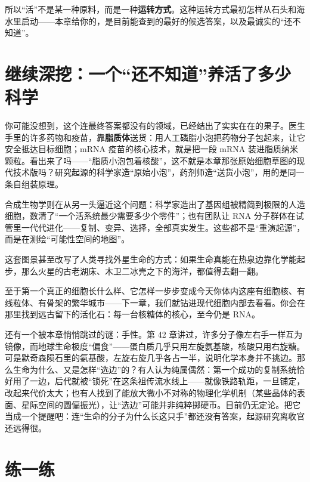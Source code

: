 所以“活”不是某一种原料，而是一种\textbf{运转方式}。这种运转方式最初怎样从石头和海水里启动——本章给你的，是目前能查到的最好的候选答案，以及最诚实的“还不知道”。

\section{继续深挖：一个“还不知道”养活了多少科学}

你可能没想到，这个连最终答案都没有的领域，已经结出了实实在在的果子。医生手里的许多药物和疫苗，靠\textbf{脂质体}送货：用人工磷脂小泡把药物分子包起来，让它安全抵达目标细胞；mRNA 疫苗的核心技术，就是把一段 mRNA 装进脂质纳米颗粒。看出来了吗——“脂质小泡包着核酸”，这不就是本章那张原始细胞草图的现代技术版吗？研究起源的科学家造“原始小泡”，药剂师造“送货小泡”，用的是同一条自组装原理。

合成生物学则在从另一头逼近这个问题：科学家造出了基因组被精简到极限的人造细胞，数清了“一个活系统最少需要多少个零件”；也有团队让 RNA 分子群体在试管里一代代进化——复制、变异、选择，全部真实发生。这些都不是“重演起源”，而是在测绘“可能性空间的地图”。

这套图景甚至改写了人类寻找外星生命的方式：如果生命真能在热泉边靠化学能起步，那么火星的古老湖床、木卫二冰壳之下的海洋，都值得去翻一翻。

至于第一个真正的细胞长什么样、它怎样一步步变成今天你体内这座有细胞核、有线粒体、有骨架的繁华城市——下一章，我们就钻进现代细胞内部去看看。你会在那里找到远古留下的活化石：每一台核糖体的核心，至今仍是 RNA。

\begin{tiaozhan}
还有一个被本章悄悄跳过的谜：手性。第 42 章讲过，许多分子像左右手一样互为镜像，而地球生命极度“偏食”——蛋白质几乎只用左旋氨基酸，核酸只用右旋糖。可是默奇森陨石里的氨基酸，左旋右旋几乎各占一半，说明化学本身并不挑边。那么生命为什么、又是怎样“选边”的？有人认为纯属偶然：第一个成功的复制系统恰好用了一边，后代就被“锁死”在这条祖传流水线上——就像铁路轨距，一旦铺定，改起来代价太大；也有人找到了能放大微小不对称的物理化学机制（某些晶体的表面、星际空间的圆偏振光），让“选边”可能并非纯粹掷硬币。目前仍无定论。把它当成一个提醒吧：连“生命的分子为什么长这只手”都还没有答案，起源研究离收官还远得很。
\end{tiaozhan}

\section*{练一练}

